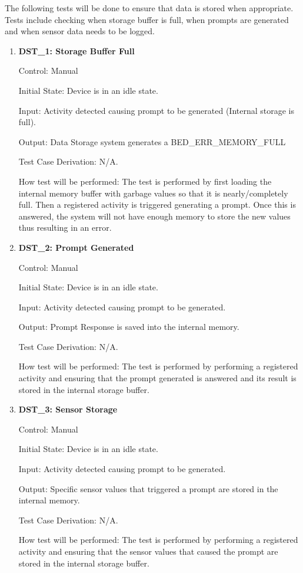 \documentclass[12pt, titlepage]{article}
\begin{document}
The following tests will be done to ensure that data is stored when appropriate. Tests include checking when storage buffer is full, when prompts are generated and when sensor data needs to be logged. 
\begin{enumerate}
	\item{\textbf{DST\_1: Storage Buffer Full} \\}
	
		Control: Manual 
							
		Initial State: Device is in an idle state.
							
		Input: Activity detected causing prompt to be generated (Internal storage is full).
		
		Output: Data Storage system generates a BED\_ERR\_MEMORY\_FULL
		
		Test Case Derivation: N/A.
							
		How test will be performed: The test is performed by first loading the internal memory buffer with garbage values so that it is nearly/completely full. Then a registered activity is triggered generating a 					prompt. Once this is answered, the system will not have enough memory to store the new values thus resulting in an error.

	\item{\textbf{DST\_2: Prompt Generated} \\}
	
		Control: Manual 
							
		Initial State: Device is in an idle state.
							
		Input: Activity detected causing prompt to be generated.
		
		Output: Prompt Response is saved into the internal memory.
		
		Test Case Derivation: N/A.
							
		How test will be performed: The test is performed by performing a registered activity and ensuring that the prompt generated is answered and its result is stored in the internal storage buffer.

	\item{\textbf{DST\_3: Sensor Storage} \\}
	
		Control: Manual 
							
		Initial State: Device is in an idle state.
							
		Input: Activity detected causing prompt to be generated.
		
		Output: Specific sensor values that triggered a prompt are stored in the internal memory.
		
		Test Case Derivation: N/A.
							
		How test will be performed: The test is performed by performing a registered activity and ensuring that the sensor values that caused the prompt are stored in the internal storage buffer.
\end{enumerate}
\end{document}
